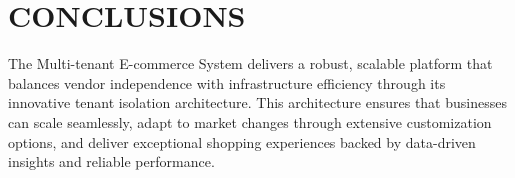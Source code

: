 \chapter{CONCLUSIONS}\label{ch:conclusion}

The Multi-tenant E-commerce System delivers a robust, scalable platform that balances vendor independence with infrastructure efficiency through its innovative tenant isolation architecture. This architecture ensures that businesses can scale seamlessly, adapt to market changes through extensive customization options, and deliver exceptional shopping experiences backed by data-driven insights and reliable performance.
